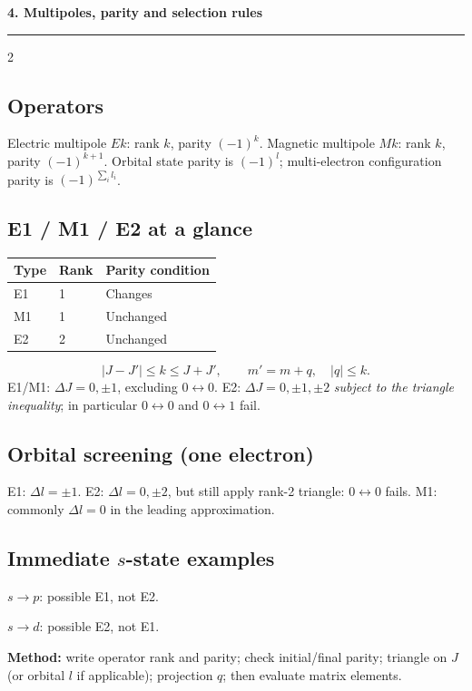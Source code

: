 
{\Large\bfseries\color{accent}4. Multipoles, parity and selection rules}
\hrule\smallskip
\begin{multicols}{2}
\subsection*{Operators}
Electric multipole \(E k\): rank \(k\), parity \((-1)^k\).
Magnetic multipole \(M k\): rank \(k\), parity \((-1)^{k+1}\).
Orbital state parity is \((-1)^l\); multi-electron
configuration parity is \((-1)^{\sum_i l_i}\).
\subsection*{E1 / M1 / E2 at a glance}
\begin{tabular}{@{}lll@{}}\toprule
Type & Rank & Parity condition\\\midrule
E1 & 1 & Changes\\
M1 & 1 & Unchanged\\
E2 & 2 & Unchanged\\\bottomrule
\end{tabular}
\[
|J-J'|\le k\le J+J',\qquad m'=m+q,\quad |q|\le k.
\]
E1/M1: \(\Delta J=0,\pm1\), excluding \(0\leftrightarrow0\).
E2: \(\Delta J=0,\pm1,\pm2\) \emph{subject to the triangle inequality};
in particular \(0\leftrightarrow0\) and \(0\leftrightarrow1\) fail.
\subsection*{Orbital screening (one electron)}
E1: \(\Delta l=\pm1\). E2:
\(\Delta l=0,\pm2\), but still apply rank-2
triangle: \(0\leftrightarrow0\) fails.
M1: commonly \(\Delta l=0\) in the leading approximation.
\subsection*{Immediate \(s\)-state examples}
\(s\to p\): possible E1, not E2.

\(s\to d\): possible E2, not E1.
\begin{methodbox}
\textbf{Method:} write operator rank and parity;
check initial/final parity; triangle on \(J\)
(or orbital \(l\) if applicable); projection \(q\);
then evaluate matrix elements.
\end{methodbox}
\end{multicols}
